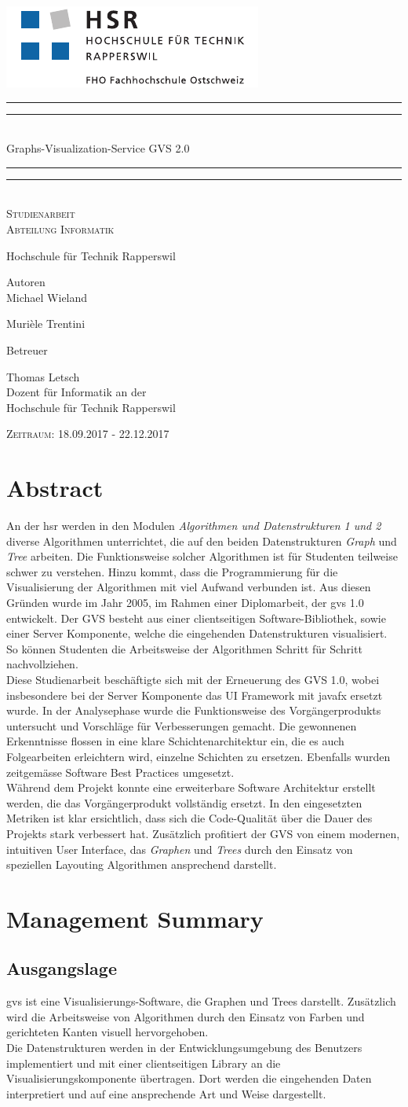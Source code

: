 \documentclass[11pt,a4paper,english,oneside]{book}
\newcommand*{\plogo}{\includegraphics{logo_hsr.pdf}}
\numberwithin{equation}{chapter}
\newcommand*{\titleGP}{\begingroup %
	\centering %
	\vspace*{\baselineskip} %
	\plogo\\[2\baselineskip] %
	\rule{\textwidth}{1.6pt}\vspace*{-\baselineskip}\vspace*{2pt} %
	\rule{\textwidth}{0.4pt}\\[\baselineskip] %
	{\LARGE Graphs-Visualization-Service GVS 2.0 }\\[0.2\baselineskip] %
	\rule{\textwidth}{0.4pt}\vspace*{-\baselineskip}\vspace{3.2pt} %
	\rule{\textwidth}{1.6pt}\\[2\baselineskip] %
	\scshape %
	\large Studienarbeit \\[2\baselineskip]
	Abteilung Informatik \par
	Hochschule für Technik Rapperswil
	\vspace*{2\baselineskip}
	
	
	Autoren\\
	{\Large  Michael Wieland  \\ [5pt]}
	
	{\Large Murièle Trentini \\ [5pt]}
	
	\vspace*{2\baselineskip}
	Betreuer\\
	{\Large Thomas Letsch  \\[5pt]
		\small Dozent für Informatik an der \\[5pt]Hochschule für Technik Rapperswil\par}
	\vspace*{2\baselineskip}
	
	\vfill
	{\scshape Zeitraum: 18.09.2017 - 22.12.2017} \\[0.3\baselineskip]
	\endgroup}
\begin{document}
	\thispagestyle{empty}
	\titleGP
	\newpage
	\doublespacing
	\setcounter{page}{1}
	\section*{Abstract}
	\thispagestyle{firststyle}
	An der \gls{hsr} werden in den Modulen \textit{Algorithmen und Datenstrukturen 1 und 2} diverse Algorithmen unterrichtet, die auf den beiden Datenstrukturen \textit{Graph} und \textit{Tree} arbeiten. Die Funktionsweise solcher Algorithmen ist für Studenten teilweise schwer zu verstehen. Hinzu kommt, dass die Programmierung für die Visualisierung der Algorithmen mit viel Aufwand verbunden ist. Aus diesen Gründen wurde im Jahr 2005, im Rahmen einer Diplomarbeit, der \gls{gvs} 1.0 entwickelt. Der GVS besteht aus einer clientseitigen Software-Bibliothek, sowie einer Server Komponente, welche die eingehenden Datenstrukturen visualisiert. So können Studenten die Arbeitsweise der Algorithmen Schritt für Schritt nachvollziehen. \\
	
	\noindent Diese Studienarbeit beschäftigte sich mit der Erneuerung des GVS 1.0, wobei insbesondere bei der Server Komponente das UI Framework mit \gls{javafx} ersetzt wurde. In der Analysephase wurde die Funktionsweise des Vorgängerprodukts untersucht und Vorschläge für Verbesserungen gemacht. Die gewonnenen Erkenntnisse flossen in eine klare Schichtenarchitektur ein, die es auch Folgearbeiten erleichtern wird, einzelne Schichten zu ersetzen. Ebenfalls wurden zeitgemässe Software Best Practices umgesetzt. \\

	\noindent Während dem Projekt konnte eine erweiterbare Software Architektur erstellt werden, die das Vorgängerprodukt vollständig ersetzt. In den eingesetzten Metriken ist klar ersichtlich, dass sich die Code-Qualität über die Dauer des Projekts stark verbessert hat. Zusätzlich profitiert der GVS von einem modernen, intuitiven User Interface, das \textit{Graphen} und \textit{Trees} durch den Einsatz von speziellen Layouting Algorithmen ansprechend darstellt.
	
	\newpage
	
	\section*{Management Summary}
	\thispagestyle{firststyle}
	\subsection*{Ausgangslage}
	\gls{gvs} ist eine Visualisierungs-Software, die Graphen und Trees darstellt. Zusätzlich wird die Arbeitsweise von Algorithmen durch den Einsatz von Farben und gerichteten Kanten visuell hervorgehoben. \\
	Die Datenstrukturen werden in der Entwicklungsumgebung des Benutzers implementiert und mit einer clientseitigen Library an die Visualisierungskomponente übertragen. Dort werden die eingehenden Daten interpretiert und auf eine ansprechende Art und Weise dargestellt. \\
	
\end{document}
